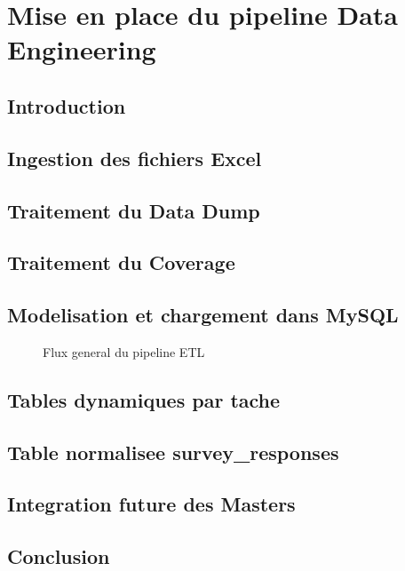 \chapter{Mise en place du pipeline Data Engineering}

\section{Introduction}

\section{Ingestion des fichiers Excel}

\section{Traitement du Data Dump}

\section{Traitement du Coverage}

\section{Modelisation et chargement dans MySQL}

\begin{figure}[htbp]
    \centering
    \caption{Flux general du pipeline ETL}
    \label{fig:flux_etl}
\end{figure}

\section{Tables dynamiques par tache}

\section{Table normalisee survey\_responses}

\section{Integration future des Masters}

\section{Conclusion}


